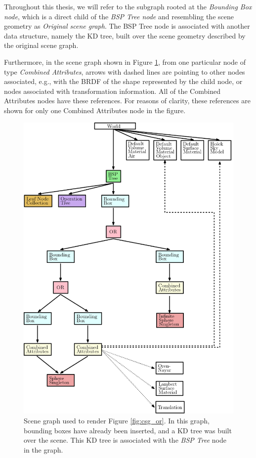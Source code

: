 Throughout this thesis, we will refer to the subgraph rooted at the \emph{Bounding Box node}, which is a direct child of the \emph{BSP Tree node} and resembling the scene geometry as \emph{Original scene graph}. The BSP Tree node is associated with another data structure, namely the KD tree, built over the scene geometry described by the original scene graph.  

Furthermore, in the scene graph shown in Figure \ref{fig:scene_graph}, from one particular node of type \emph{Combined Attributes}, arrows with dashed lines are pointing to other nodes associated, e.g., with the BRDF of the shape represented by the child node, or nodes associated with transformation information. All of the Combined Attributes nodes have these references. For reasons of clarity, these references are shown for only one Combined Attributes node in the figure.

\begin{figure}[H]
	\centering	
	\includegraphics[width=1\linewidth]{img/2 art/scene_graph.png}
	\caption{Scene graph used to render Figure \ref{fig:csg_or}. In this graph, bounding boxes have already been inserted, and a KD tree was built over the scene. This KD tree is associated with the \emph{BSP Tree} node in the graph.} 
	\label{fig:scene_graph}
\end{figure}

